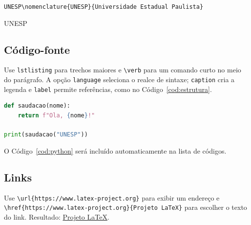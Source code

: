 \begin{lstlisting}[language={[LaTeX]TeX},caption={Cadastro de uma sigla}]
UNESP\nomenclature{UNESP}{Universidade Estadual Paulista}
\end{lstlisting}

UNESP

\subsection{Código-fonte}

Use \texttt{lstlisting} para trechos maiores e \verb|\verb| para um comando curto
no meio do parágrafo. A opção \texttt{language} seleciona o realce de sintaxe;
\texttt{caption} cria a legenda e \texttt{label} permite referências, como no
Código~\ref{cod:estrutura}.

\begin{lstlisting}[language=Python,caption={Exemplo de código Python},label={cod:python}]
def saudacao(nome):
    return f"Ola, {nome}!"

print(saudacao("UNESP"))
\end{lstlisting}

O Código~\ref{cod:python} será incluído automaticamente na lista de códigos.

\subsection{Links}

Use \verb|\url{https://www.latex-project.org}| para exibir um endereço e
\verb|\href{https://www.latex-project.org}{Projeto LaTeX}| para escolher o texto
do link. Resultado: \href{https://www.latex-project.org}{Projeto \LaTeX}.
